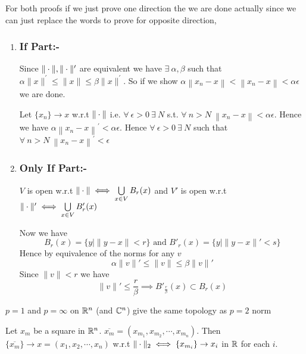 \begin{myproof}
	For both proofs if we just prove one direction the we are done actually since we can just replace
	the words to prove for opposite direction,
	\begin{enumerate}[label=(\roman*)]
		\item \parinn\subsubsection{If Part:-}
		      Since $\|\cdot\|,\|\cdot\|^{\prime}$ are equivalent we have $\exists\ \alpha, \beta$ such that $\alpha\|x\|^{\prime} \leq\|x\| \leq \beta\|x\|^{\prime}$. So if we show $\alpha\left\|x_{n}-x\right\|<\left\|x_{n}-x\right\|<\alpha \epsilon$ we are done.

		      Let $\{x_{n}\} \to x$ w.r.t $\|\cdot\|$ i.e. $\forall\ \epsilon>0\ \exists\ N$ s.t. $\forall\ n>N\ \left\|x_{n}-x\right\|<\alpha \epsilon$. Hence we have $\alpha\left\|x_{n}-x\right\|^{\prime}<\alpha \epsilon$. Hence $\forall \ \epsilon>0\ \exists\ N$ such that $\forall\ n>N\ \left\|x_{n}-x\right\|^{\prime}<\epsilon$\Qed

		\item \subsubsection{Only If Part:-}\parinn
		      $V$ is open w.r.t $\|\cdot\|\iff\bigcup\limits_{x\in V}B_r(x)$ and $V'$ is open w.r.t $\|\cdot\|'\iff\bigcup\limits_{x\in V}B'_r(x)$

		      Now we have $$B_r(x)=\{y\mid \|y-x\|<r\}\text{ and } B'_r(x)=\{y\mid \|y-x\|'<s\}$$Hence by equivalence of the norms for any $v$ $$\alpha \|v\|'\leq \|v\|\leq \beta\|v\|'$$ Since $\|v\|<r$ we have $$\|v\|'\leq \frac{r}{\beta}\implies B'_{\frac{r}{\beta}}(x)\subset B_r(x)$$
	\end{enumerate}

\end{myproof}
\begin{corollary}{}{}
	$p=1$ and $p=\infty$ on $\mathbb{R}^n$ (and $\mathbb{C}^n$) give the same topology as $p=2$ norm
\end{corollary}
\begin{corollary}{}{}
	Let $x_m$ be a square in $\mathbb{R}^n$. $\overline{x_m}=(x_{m_1},x_{m_2},\cdots,x_{m_n})$. Then $\{\overline{x_m}\}\to x=(x_1,x_2,\cdots,x_n)$ w.r.t $\|\cdot\|_2\iff \{x_{m_i}\}\to x_i$ in $\mathbb{R}$ for each $i$.
\end{corollary}
